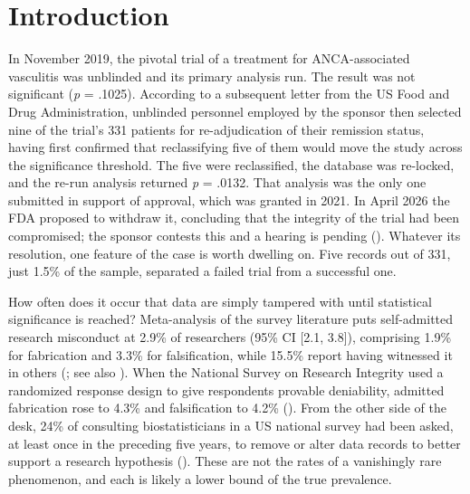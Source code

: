 \documentclass[
  nonatbib,
  authoryear,
  preprint]{elsarticle}
\begin{document}
\section{Introduction}\label{introduction}

In November 2019, the pivotal trial of a treatment for ANCA-associated
vasculitis was unblinded and its primary analysis run. The result was
not significant (\emph{p} = .1025). According to a subsequent letter
from the US Food and Drug Administration, unblinded personnel employed
by the sponsor then selected nine of the trial's 331 patients for
re-adjudication of their remission status, having first confirmed that
reclassifying five of them would move the study across the significance
threshold. The five were reclassified, the database was re-locked, and
the re-run analysis returned \emph{p} = .0132. That analysis was the
only one submitted in support of approval, which was granted in 2021. In
April 2026 the FDA proposed to withdraw it, concluding that the
integrity of the trial had been compromised; the sponsor contests this
and a hearing is pending
(). Whatever its resolution, one feature of the case is worth
dwelling on. Five records out of 331, just 1.5\% of the sample,
separated a failed trial from a successful one.

How often does it occur that data are simply tampered with until
statistical significance is reached? Meta-analysis of the survey
literature puts self-admitted research misconduct at 2.9\% of
researchers (95\% CI {[}2.1, 3.8{]}), comprising 1.9\% for fabrication
and 3.3\% for falsification, while 15.5\% report having witnessed it in
others (; see also
). When the National
Survey on Research Integrity used a randomized response design to give
respondents provable deniability, admitted fabrication rose to 4.3\% and
falsification to 4.2\%
(). From the other side of the desk, 24\% of consulting
biostatisticians in a US national survey had been asked, at least once
in the preceding five years, to remove or alter data records to better
support a research hypothesis (). These are not the rates of a vanishingly rare
phenomenon, and each is likely a lower bound of the true prevalence.
\end{document}
